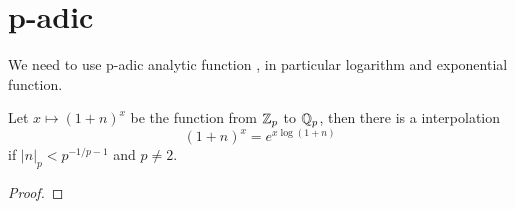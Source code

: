 \section{p-adic}

We need to use p-adic analytic function , in particular logarithm and exponential function.
\begin{lemma}
    Let \(x \mapsto (1+n)^x\) be the function from \(\mathbb{Z}_p \) to \(\mathbb{Q}_p\), then there is a interpolation
    \[(1+n)^x = e^{x \log (1+n)}\]
    if \(|n|_{p} < p^{-1/p-1}\) and \(p \neq 2\).

    \begin{proof}
        
    \end{proof}
\end{lemma}